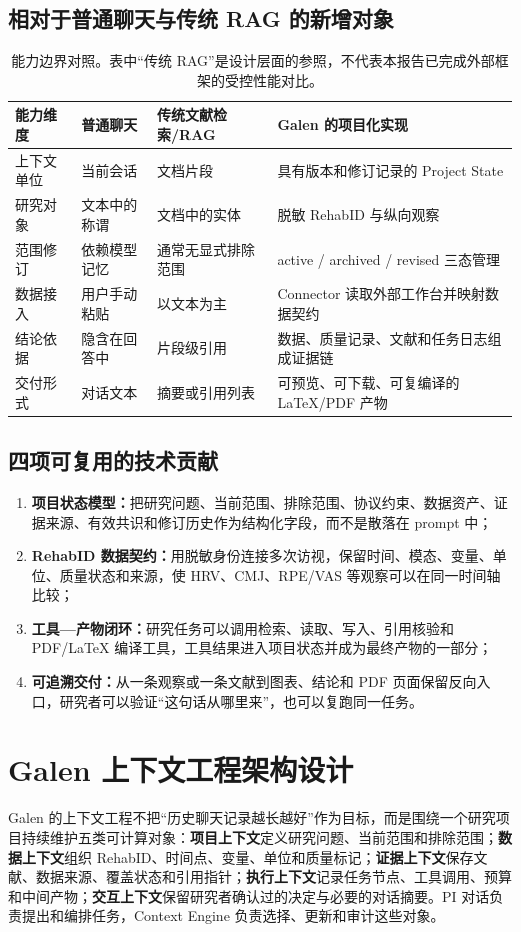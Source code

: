 \documentclass[11pt,a4paper]{article}
\begin{document}
\subsection{相对于普通聊天与传统 RAG 的新增对象}
\begin{table}[H]
\centering
\small
\begin{tabularx}{\linewidth}{@{}p{2.9cm}YYY@{}}
\toprule
能力维度 & 普通聊天 & 传统文献检索/RAG & Galen 的项目化实现 \\
\midrule
上下文单位 & 当前会话 & 文档片段 & 具有版本和修订记录的 Project State \\
研究对象 & 文本中的称谓 & 文档中的实体 & 脱敏 RehabID 与纵向观察 \\
范围修订 & 依赖模型记忆 & 通常无显式排除范围 & active / archived / revised 三态管理 \\
数据接入 & 用户手动粘贴 & 以文本为主 & Connector 读取外部工作台并映射数据契约 \\
结论依据 & 隐含在回答中 & 片段级引用 & 数据、质量记录、文献和任务日志组成证据链 \\
交付形式 & 对话文本 & 摘要或引用列表 & 可预览、可下载、可复编译的 LaTeX/PDF 产物 \\
\bottomrule
\end{tabularx}
\caption{能力边界对照。表中“传统 RAG”是设计层面的参照，不代表本报告已完成外部框架的受控性能对比。}
\end{table}

\subsection{四项可复用的技术贡献}
\begin{enumerate}[leftmargin=2.1em,itemsep=4pt]
\item \textbf{项目状态模型：}把研究问题、当前范围、排除范围、协议约束、数据资产、证据来源、有效共识和修订历史作为结构化字段，而不是散落在 prompt 中；
\item \textbf{RehabID 数据契约：}用脱敏身份连接多次访视，保留时间、模态、变量、单位、质量状态和来源，使 HRV、CMJ、RPE/VAS 等观察可以在同一时间轴比较；
\item \textbf{工具—产物闭环：}研究任务可以调用检索、读取、写入、引用核验和 PDF/LaTeX 编译工具，工具结果进入项目状态并成为最终产物的一部分；
\item \textbf{可追溯交付：}从一条观察或一条文献到图表、结论和 PDF 页面保留反向入口，研究者可以验证“这句话从哪里来”，也可以复跑同一任务。
\end{enumerate}

\section{Galen 上下文工程架构设计}
Galen 的上下文工程不把“历史聊天记录越长越好”作为目标，而是围绕一个研究项目持续维护五类可计算对象：\textbf{项目上下文}定义研究问题、当前范围和排除范围；\textbf{数据上下文}组织 RehabID、时间点、变量、单位和质量标记；\textbf{证据上下文}保存文献、数据来源、覆盖状态和引用指针；\textbf{执行上下文}记录任务节点、工具调用、预算和中间产物；\textbf{交互上下文}保留研究者确认过的决定与必要的对话摘要。PI 对话负责提出和编排任务，Context Engine 负责选择、更新和审计这些对象。
\end{document}
